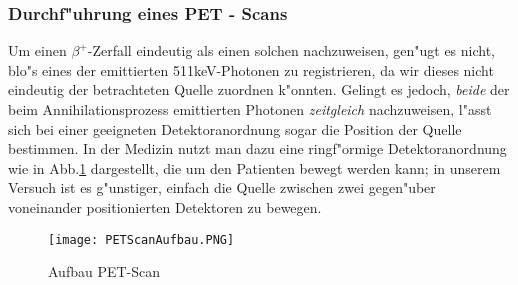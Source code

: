 \documentclass{article}
\begin{document}
\subsubsection{Durchf"uhrung eines PET - Scans}

Um einen $\beta^+$-Zerfall eindeutig als einen solchen nachzuweisen, gen"ugt es nicht, blo"s eines der emittierten 511keV-Photonen zu registrieren, da wir dieses nicht eindeutig der betrachteten Quelle zuordnen k"onnten. Gelingt es jedoch, \textit{beide} der beim Annihilationsprozess emittierten Photonen \textit{zeitgleich} nachzuweisen, l"asst sich bei einer geeigneten Detektoranordnung sogar die Position der Quelle bestimmen. In der Medizin nutzt man dazu eine ringf"ormige Detektoranordnung wie in Abb.\ref{figPET} dargestellt, die um den Patienten bewegt werden kann; in unserem Versuch ist es g"unstiger, einfach die Quelle zwischen zwei gegen"uber voneinander positionierten Detektoren zu bewegen.

\begin{figure}[H]
	\centering
	\texttt{[image: PETScanAufbau.PNG]}
	\caption[Aufbau PET-Scan]{Aufbau PET-Scan\footnotemark}
	\label{figPET}
\end{figure}
\end{document}
